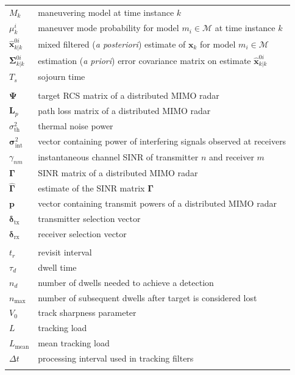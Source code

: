 \documentclass[english, 12pt, a4paper, elec, utf8, a-1b, online]{aaltothesis}
\numberwithin{equation}{section}
\renewcommand{\vec}[1]{\mathbf{#1}}
\newcommand{\x}{\vec{x}_k}
\newcommand{\modeprob}{\mu_k^i}
\newcommand{\xmxinitcurr}{\hat{\vec{x}}^{0i}_{k|k}}
\newcommand{\ecovmxinitcurr}{\bm{\Sigma}^{0i}_{k|k}}
\def\prior{\textit{a priori}}
\def\post{\textit{a posteriori}}
\newcommand{\mimm}{\mathcal{M}}
\newcommand{\dt}{\Delta t}
\newcommand{\thnoise}{\sigma^2_{\text{th}}}
\newcommand{\vpower}{\boldsymbol{p}}
\newcommand{\vintnoise}{\boldsymbol{\sigma}^2_{\text{int}}}
\newcommand{\esinr}{\gamma_{{nm}}}
\newcommand{\vsinrexp}{\boldsymbol{\Gamma}}
\newcommand{\vsinrb}{\widehat{\boldsymbol{\Gamma}}}
\newcommand{\vpl}{\vec{L}_p}
\newcommand{\vrcs}{\boldsymbol{\Psi}}
\newcommand{\vasvtx}{\boldsymbol{\delta}_{\text{tx}}}
\newcommand{\vasvrx}{\boldsymbol{\delta}_{\text{rx}}}
\newcommand{\ri}{t_r}
\begin{document}
\begin{longtable}{ll}
$M_k$ & maneuvering model at time instance $k$ \\
$\modeprob$ & maneuver mode probability for model $m_i \in \mimm$ at time instance $k$ \\
$\xmxinitcurr$ & mixed filtered (\post{}) estimate of $\x$ for model $m_i \in \mimm$\\
$\ecovmxinitcurr$ & estimation (\prior{}) error covariance matrix on estimate $\xmxinitcurr$\\
$T_s$ & sojourn time \\
&\\
$\vrcs$ & target RCS matrix of a distributed MIMO radar \\
$\vpl$ & path loss matrix of a distributed MIMO radar\\
$\thnoise$ & thermal noise power \\
$\vintnoise$ & vector containing power of interfering signals observed at receivers \\
$\esinr$ & instantaneous channel SINR of transmitter $n$ and receiver $m$ \\
$\vsinrexp$ & SINR matrix of a distributed MIMO radar \\
$\vsinrb$ & estimate of the SINR matrix $\vsinrexp$ \\
$\vpower$ & vector containing transmit powers of a distributed MIMO radar \\
$\vasvtx$ & transmitter selection vector \\
$\vasvrx$ & receiver selection vector \\
&\\
$\ri$ & revisit interval \\
$\tau_d$ & dwell time \\
$n_d$ & number of dwells needed to achieve a detection \\
$n_\text{max}$ & number of subsequent dwells after target is considered lost \\
$V_0$ & track sharpness parameter \\
$L$ & tracking load \\
$L_\text{mean}$ & mean tracking load \\
$\dt$ & processing interval used in tracking filters \\
&\\

\end{longtable}
\end{document}
